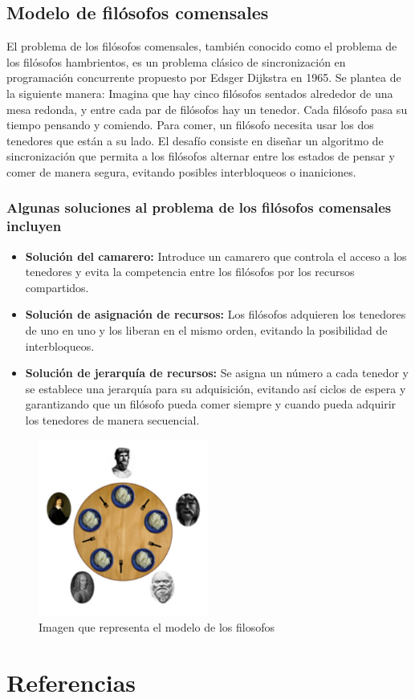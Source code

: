 \documentclass[12pt,a4paper]{article}
\begin{document}
\subsection{Modelo de filósofos comensales}
El problema de los filósofos comensales, también conocido como el problema de los filósofos hambrientos, es un problema clásico de sincronización en programación concurrente propuesto por Edsger Dijkstra en 1965. Se plantea de la siguiente manera:
\cite{filosofo}
\espacio
Imagina que hay cinco filósofos sentados alrededor de una mesa redonda, y entre cada par de filósofos hay un tenedor. Cada filósofo pasa su tiempo pensando y comiendo. Para comer, un filósofo necesita usar los dos tenedores que están a su lado.
\espacio
El desafío consiste en diseñar un algoritmo de sincronización que permita a los filósofos alternar entre los estados de pensar y comer de manera segura, evitando posibles interbloqueos o inaniciones.

\subsubsection*{Algunas soluciones al problema de los filósofos comensales incluyen}

\begin{itemize}
    \item \textbf{Solución del camarero:} Introduce un camarero que controla el acceso a los tenedores y evita la competencia entre los filósofos por los recursos compartidos.
    \item \textbf{Solución de asignación de recursos:} Los filósofos adquieren los tenedores de uno en uno y los liberan en el mismo orden, evitando la posibilidad de interbloqueos.
    \item \textbf{Solución de jerarquía de recursos:} Se asigna un número a cada tenedor y se establece una jerarquía para su adquisición, evitando así ciclos de espera y garantizando que un filósofo pueda comer siempre y cuando pueda adquirir los tenedores de manera secuencial.
\end{itemize}

\begin{figure}[htb!]
    \centering
    \caption{Imagen que representa el modelo de los filosofos } 
    \includegraphics[width=0.5\textwidth]{images/filosofo.png}
    
\end{figure}


\newpage
\section{Referencias}


\end{document}
